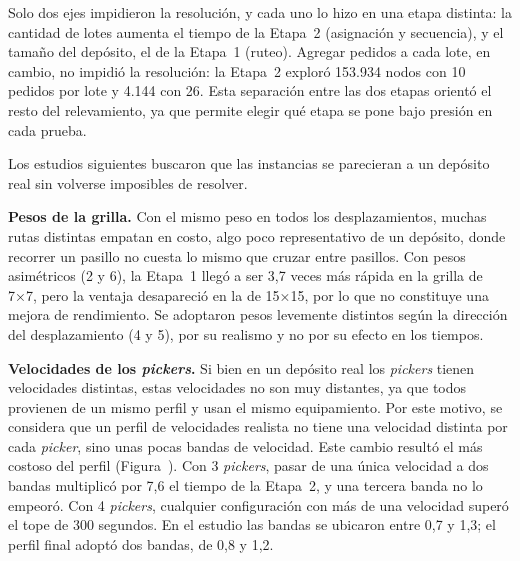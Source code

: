 Solo dos ejes impidieron la resolución, y cada uno lo hizo en una etapa
distinta: la cantidad de lotes aumenta el tiempo de la Etapa~2 (asignación y
secuencia), y el tamaño del depósito, el de la Etapa~1
(ruteo). Agregar pedidos a cada lote, en cambio, no impidió la resolución: 
la Etapa~2 exploró 153.934 nodos con 10 pedidos por lote y
4.144 con 26. Esta separación entre las dos etapas orientó el resto del
relevamiento, ya que permite elegir qué etapa se pone bajo presión en cada
prueba.

\stopsection

\startsection[title={Exploración de instancias más realistas}]

Los estudios siguientes buscaron que las instancias se parecieran a un
depósito real sin volverse imposibles de resolver.

{\bf Pesos de la grilla.} Con el mismo peso en todos los desplazamientos,
muchas rutas distintas empatan en costo, algo poco representativo de un
depósito, donde recorrer un pasillo no cuesta lo mismo que cruzar entre
pasillos. Con pesos asimétricos (2 y 6), la Etapa~1 llegó a ser 3,7 veces
más rápida en la grilla de 7×7, pero la ventaja desapareció en la de
15×15, por lo que no constituye una mejora de rendimiento. Se adoptaron
pesos levemente distintos según la dirección del desplazamiento (4 y 5),
por su realismo y no por su efecto en los tiempos.

{\bf Velocidades de los {\em pickers}.} Si bien en un depósito real los
{\em pickers} tienen velocidades distintas, estas velocidades no son muy distantes,
ya que todos provienen de un mismo perfil y usan el mismo equipamiento. Por este motivo, 
se considera que un perfil de velocidades realista no tiene una velocidad distinta 
por cada {\em picker}, sino unas pocas bandas de velocidad. Este cambio
resultó el más costoso del perfil (Figura~).
Con 3 {\em pickers}, pasar de una única velocidad a dos bandas multiplicó
por 7,6 el tiempo de la Etapa~2, y una tercera banda no lo empeoró. Con 4
{\em pickers}, cualquier configuración con más de una velocidad superó el
tope de 300 segundos. En el estudio las bandas se ubicaron entre 0,7 y
1,3; el perfil final adoptó dos bandas, de 0,8 y 1,2.

